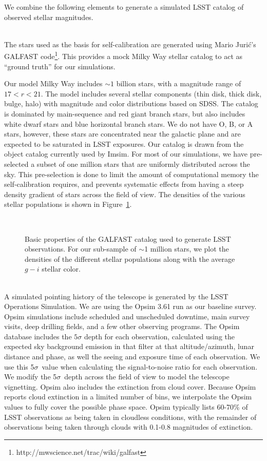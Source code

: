 \documentclass[12pt,preprint]{aastex}
\begin{document}
We combine the following elements to generate a simulated LSST catalog of observed stellar magnitudes.

\\
The stars used as the basis for self-calibration are generated using Mario Juri\'{c}'s GALFAST code\footnote{ http://mwscience.net/trac/wiki/galfast}.  This provides a mock Milky Way stellar catalog to act as ``ground truth'' for our simulations.  

Our model Milky Way includes $\sim1$ billion stars, with a magnitude range of $17 < r < 21$.  The model includes several stellar components (thin disk, thick disk, bulge, halo) with magnitude and color distributions based on SDSS. The catalog is dominated by main-sequence and red giant branch stars, but also includes white dwarf stars and blue horizontal branch stars.  We do not have O, B, or A stars, however, these stars are concentrated near the galactic plane and are expected to be saturated in LSST exposures.  Our catalog is drawn from the object catalog currently used by Imsim.  For most of our simulations, we have pre-selected a subset of one million stars that are uniformly distributed across the sky.  This pre-selection is done to limit the amount of computational memory the self-calibration requires, and prevents systematic effects from having a steep density gradient of stars across the field of view.  The densities of the various stellar populations is shown in Figure~\ref{fig:gfpop}.


\begin{figure}
\\
\caption{Basic properties of the GALFAST catalog used to generate LSST observations.  For our sub-sample of $\sim$1 million stars, we plot the densities of the different stellar populations along with the average $g-i$ stellar color.\label{fig:gfpop}}
\end{figure}


\\
A simulated pointing history of the telescope is generated by the LSST Operations Simulation. We are using the Opsim 3.61 run as our baseline survey.  Opsim simulations include scheduled and unscheduled downtime, main survey visits, deep drilling fields, and a few other observing programs. The Opsim database includes the $5\sigma$ depth for each observation, calculated using the expected sky background emission in that filter at that altitude/azimuth, lunar distance and phase, as well the seeing and exposure time of each observation.  We use this 5$\sigma$\ value when calculating the signal-to-noise ratio for each observation.  We modify the 5$\sigma$\ depth across the field of view to model the telescope vignetting.  Opsim also includes the extinction from cloud cover.  Because Opsim reports cloud extinction in a limited number of bins, we interpolate the Opsim values to fully cover the possible phase space.  Opsim typically lists 60-70\% of LSST observations as being taken in cloudless conditions, with the remainder of observations being taken through clouds with 0.1-0.8 magnitudes of extinction.  
\end{document}
